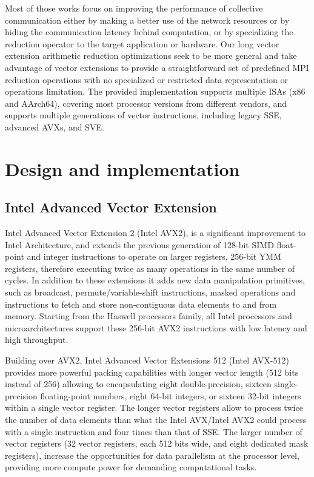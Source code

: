 \documentclass[5p,times,twocolumn]{elsarticle}
\begin{document}
Most of those works focus on improving the performance of collective
communication either by making a better use of the network resources or by hiding the communication latency behind computation, or by specializing the reduction operator to the target application or hardware.
Our long vector extension arithmetic reduction
optimizations seek to be more general and take advantage of vector extensions to provide a
straightforward set of predefined MPI reduction operations with no specialized or restricted data representation or operations limitation.
The provided implementation supports multiple ISAs (x86 and AArch64), covering most processor versions from different vendors, and supports multiple generations of vector instructions, including legacy SSE, advanced AVXs, and SVE.

\section{Design and implementation}\label{sec:design}
\subsection{Intel Advanced Vector Extension}
Intel Advanced Vector Extension 2 (Intel AVX2), is a significant improvement to Intel Architecture, and extends the previous generation of 128-bit SIMD float-point
and integer instructions to operate on larger registers, 256-bit YMM registers, therefore executing twice as many operations in the same number of cycles.
%
In addition to these extensions it adds new data manipulation primitives, such as broadcast, permute/variable-shift instructions, masked operations and instructions to fetch and store non-contiguous data elements to and from memory. Starting from the Haswell processors family, all Intel processors and microarchitectures support these 256-bit AVX2 instructions with low latency and high throughput.

Building over AVX2, Intel Advanced Vector Extensions 512 (Intel AVX-512) provides more powerful packing
capabilities with longer vector length (512 bits instead of 256) allowing to encapsulating eight double-precision,
sixteen single-precision floating-point numbers,
eight 64-bit integers, or sixteen 32-bit integers within a single vector register.
The longer vector registers allow to process twice the number of data elements
than what the Intel AVX/Intel AVX2 could
process with a single instruction and four times than that of SSE.
The larger number of vector registers (32 vector registers, each 512 bits wide,
and eight dedicated mask registers), increase the opportunities for data parallelism at the processor level, providing more compute power for demanding computational tasks.
\end{document}
